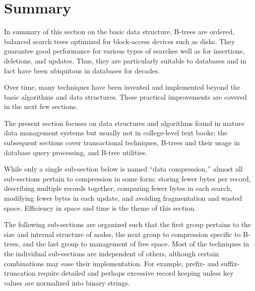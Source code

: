 \hypertarget{summary}{%
\section{Summary}\label{summary}}

In summary of this section on the basic data structure, B-trees are
ordered, balanced search trees optimized for block-access devices such
as disks. They guarantee good performance for various types of searches
well as for insertions, deletions, and updates. Thus, they are
particularly suitable to databases and in fact have been ubiquitous in
databases for decades.

Over time, many techniques have been invented and implemented beyond the
basic algorithms and data structures. These practical improvements are
covered in the next few sections.

The present section focuses on data structures and algorithms found in
mature data management systems but usually not in college-level text
books; the subsequent sections cover transactional techniques, B-trees
and their usage in database query processing, and B-tree utilities.

While only a single sub-section below is named ``data compression,''
almost all sub-sections pertain to compression in some form: storing
fewer bytes per record, describing multiple records together, comparing
fewer bytes in each search, modifying fewer bytes in each update, and
avoiding fragmentation and wasted space. Efficiency in space and time is
the theme of this section.

The following sub-sections are organized such that the first group
pertains to the size and internal structure of nodes, the next group to
compression specific to B-trees, and the last group to management of
free space. Most of the techniques in the individual sub-sections are
independent of others, although certain combinations may ease their
implementation. For example, prefix- and suffix-truncation require
detailed and perhaps excessive record keeping unless key values are
normalized into binary strings.
